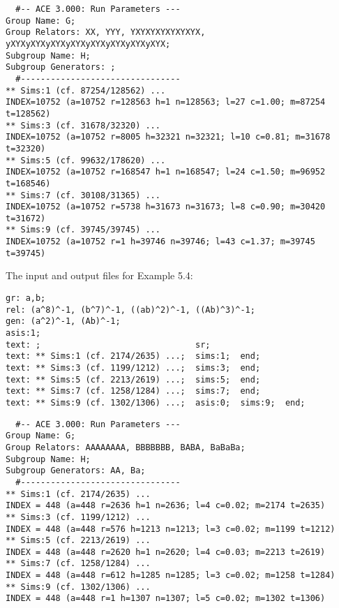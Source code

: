 \bv\begin{verbatim}
  #-- ACE 3.000: Run Parameters ---
Group Name: G;
Group Relators: XX, YYY, YXYXYXYXYXYXYX, yXYXyXYXyXYXyXYXyXYXyXYXyXYXyXYX;
Subgroup Name: H;
Subgroup Generators: ;
  #--------------------------------
** Sims:1 (cf. 87254/128562) ...
INDEX=10752 (a=10752 r=128563 h=1 n=128563; l=27 c=1.00; m=87254 t=128562)
** Sims:3 (cf. 31678/32320) ...
INDEX=10752 (a=10752 r=8005 h=32321 n=32321; l=10 c=0.81; m=31678 t=32320)
** Sims:5 (cf. 99632/178620) ...
INDEX=10752 (a=10752 r=168547 h=1 n=168547; l=24 c=1.50; m=96952 t=168546)
** Sims:7 (cf. 30108/31365) ...
INDEX=10752 (a=10752 r=5738 h=31673 n=31673; l=8 c=0.90; m=30420 t=31672)
** Sims:9 (cf. 39745/39745) ...
INDEX=10752 (a=10752 r=1 h=39746 n=39746; l=43 c=1.37; m=39745 t=39745)
\end{verbatim}\ev

The input and output files for Example 5.4:

\bv\begin{verbatim}
gr: a,b;
rel: (a^8)^-1, (b^7)^-1, ((ab)^2)^-1, ((Ab)^3)^-1;
gen: (a^2)^-1, (Ab)^-1;
asis:1;
text: ;                               sr;
text: ** Sims:1 (cf. 2174/2635) ...;  sims:1;  end;
text: ** Sims:3 (cf. 1199/1212) ...;  sims:3;  end;
text: ** Sims:5 (cf. 2213/2619) ...;  sims:5;  end;
text: ** Sims:7 (cf. 1258/1284) ...;  sims:7;  end;
text: ** Sims:9 (cf. 1302/1306) ...;  asis:0;  sims:9;  end;
\end{verbatim}\ev

\bv\begin{verbatim}
  #-- ACE 3.000: Run Parameters ---
Group Name: G;
Group Relators: AAAAAAAA, BBBBBBB, BABA, BaBaBa;
Subgroup Name: H;
Subgroup Generators: AA, Ba;
  #--------------------------------
** Sims:1 (cf. 2174/2635) ...
INDEX = 448 (a=448 r=2636 h=1 n=2636; l=4 c=0.02; m=2174 t=2635)
** Sims:3 (cf. 1199/1212) ...
INDEX = 448 (a=448 r=576 h=1213 n=1213; l=3 c=0.02; m=1199 t=1212)
** Sims:5 (cf. 2213/2619) ...
INDEX = 448 (a=448 r=2620 h=1 n=2620; l=4 c=0.03; m=2213 t=2619)
** Sims:7 (cf. 1258/1284) ...
INDEX = 448 (a=448 r=612 h=1285 n=1285; l=3 c=0.02; m=1258 t=1284)
** Sims:9 (cf. 1302/1306) ...
INDEX = 448 (a=448 r=1 h=1307 n=1307; l=5 c=0.02; m=1302 t=1306)
\end{verbatim}\ev

